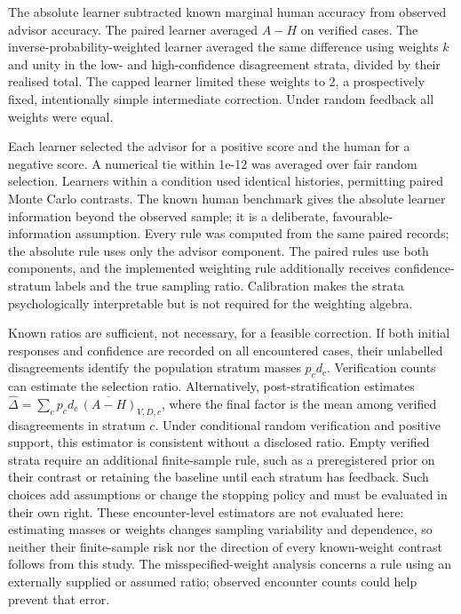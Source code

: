 \documentclass[
  british,
  11pt,
]{article}
\begin{document}
The absolute learner subtracted known marginal human accuracy from
observed advisor accuracy. The paired learner averaged \(A-H\) on
verified cases. The inverse-probability-weighted learner averaged the
same difference using weights \(k\) and unity in the low- and
high-confidence disagreement strata, divided by their realised total.
The capped learner limited these weights to 2, a prospectively fixed,
intentionally simple intermediate correction. Under random feedback all
weights were equal.

Each learner selected the advisor for a positive score and the human for
a negative score. A numerical tie within 1e-12 was averaged over fair
random selection. Learners within a condition used identical histories,
permitting paired Monte Carlo contrasts. The known human benchmark gives
the absolute learner information beyond the observed sample; it is a
deliberate, favourable-information assumption. Every rule was computed
from the same paired records; the absolute rule uses only the advisor
component. The paired rules use both components, and the implemented
weighting rule additionally receives confidence-stratum labels and the
true sampling ratio. Calibration makes the strata psychologically
interpretable but is not required for the weighting algebra.

Known ratios are sufficient, not necessary, for a feasible correction.
If both initial responses and confidence are recorded on all encountered
cases, their unlabelled disagreements identify the population stratum
masses \(p_c d_c\). Verification counts can estimate the selection
ratio. Alternatively, post-stratification estimates
\(\widehat\Delta=\sum_c \widehat{p_c d_c}\,\overline{(A-H)}_{V,D,c}\),
where the final factor is the mean among verified disagreements in
stratum \(c\). Under conditional random verification and positive
support, this estimator is consistent without a disclosed ratio. Empty
verified strata require an additional finite-sample rule, such as a
preregistered prior on their contrast or retaining the baseline until
each stratum has feedback. Such choices add assumptions or change the
stopping policy and must be evaluated in their own right. These
encounter-level estimators are not evaluated here: estimating masses or
weights changes sampling variability and dependence, so neither their
finite-sample risk nor the direction of every known-weight contrast
follows from this study. The misspecified-weight analysis concerns a
rule using an externally supplied or assumed ratio; observed encounter
counts could help prevent that error.
\end{document}
